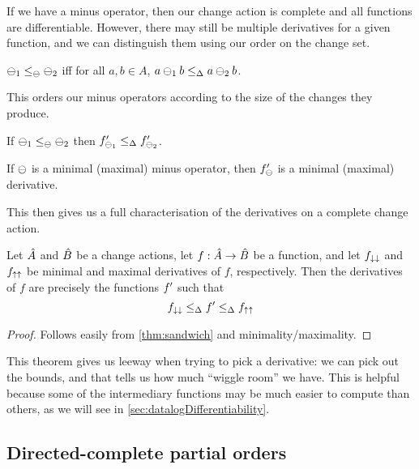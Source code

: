 If we have a minus operator, then our change action is complete and all
functions are differentiable. However, there may still be multiple derivatives
for a given function, and we can distinguish them using our order on the change
set.

\begin{defn}
  $\ominus_1 \leq_\ominus \ominus_2$ iff for all $a,b \in A$, $a \ominus_1 b
  \leq_\Delta a \ominus_2 b$.
\end{defn}

This orders our minus operators according to the size of the changes they
produce.

\begin{prop}
  If $\ominus_1 \leq_\ominus \ominus_2$ then
  $f'_{\ominus_1} \leq_\Delta f'_{\ominus_2}$.
\end{prop}

\begin{prop}
  If $\ominus$ is a minimal (maximal) minus operator, then $f'_\ominus$
  is a minimal (maximal) derivative.
\end{prop}

This then gives us a full characterisation of the derivatives on a complete
change action.

\begin{thm}
\label{thm:derivativeCharacterization}
  Let $\hat{A}$ and $\hat{B}$ be a change actions, let
  $f: \hat{A} \rightarrow \hat{B}$ be a function, and let $f_{\downarrow\downarrow}$ and
  $f_{\uparrow\uparrow}$ be minimal and maximal derivatives of $f$, respectively.
  Then the derivatives of $f$ are precisely
  the functions $f'$ such that
  $$f_{\downarrow\downarrow} \leq_\Delta f' \leq_\Delta f_{\uparrow\uparrow}$$
\end{thm}
\ifproofs
\begin{proof}
  Follows easily from \cref{thm:sandwich} and minimality/maximality.
\end{proof}
\fi

This theorem gives us leeway when trying to pick a derivative: we can pick out the
bounds, and that tells us how much ``wiggle room'' we have. This is helpful
because some of the intermediary functions may be much easier to compute than
others, as we will see in \cref{sec:datalogDifferentiability}.

\subsection{Directed-complete partial orders}

